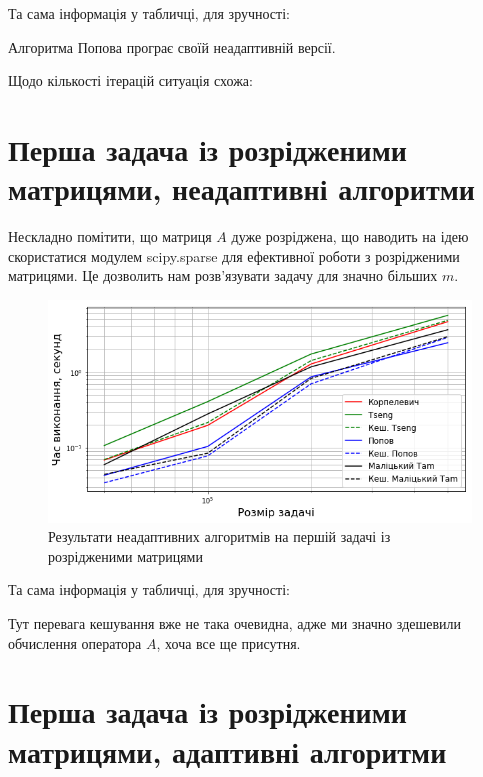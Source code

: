 Та сама інформація у табличці, для зручності:



Алгоритма Попова програє своїй неадаптивній версії. \medskip

Щодо кількості ітерацій ситуація схожа:



\section{Перша задача із розрідженими матрицями, неадаптивні алгоритми}

Нескладно помітити, що матриця $A$ дуже розріджена, що наводить на ідею скористатися модулем scipy.sparse для ефективної роботи з розрідженими матрицями. Це дозволить нам розв'язувати задачу для значно більших $m$.

\begin{figure}[H]
    \centering
    \includegraphics[width=\textwidth]{img/1/sparse/time.png}
    \caption{Результати неадаптивних алгоритмів на першій задачі із розрідженими матрицями}
\end{figure}

Та сама інформація у табличці, для зручності:





\begin{remark}
    Тут перевага кешування вже не така очевидна, адже ми значно здешевили обчислення оператора $A$, хоча все ще присутня.
\end{remark}

\section{Перша задача із розрідженими матрицями, адаптивні алгоритми}

